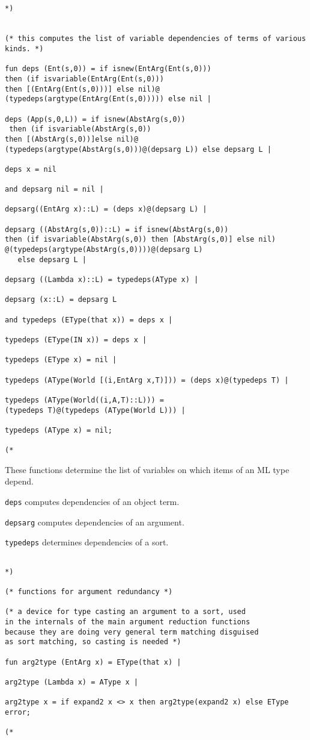 \documentclass{article}
\begin{document}
\begin{verbatim}


*)


(* this computes the list of variable dependencies of terms of various kinds. *)

fun deps (Ent(s,0)) = if isnew(EntArg(Ent(s,0))) 
then (if isvariable(EntArg(Ent(s,0)))  
then [(EntArg(Ent(s,0)))] else nil)@
(typedeps(argtype(EntArg(Ent(s,0))))) else nil |

deps (App(s,0,L)) = if isnew(AbstArg(s,0))
 then (if isvariable(AbstArg(s,0))   
then [(AbstArg(s,0))]else nil)@
(typedeps(argtype(AbstArg(s,0)))@(depsarg L)) else depsarg L |

deps x = nil 

and depsarg nil = nil |

depsarg((EntArg x)::L) = (deps x)@(depsarg L) |

depsarg ((AbstArg(s,0))::L) = if isnew(AbstArg(s,0)) 
then (if isvariable(AbstArg(s,0)) then [AbstArg(s,0)] else nil)
@(typedeps(argtype(AbstArg(s,0))))@(depsarg L)
   else depsarg L |

depsarg ((Lambda x)::L) = typedeps(AType x) |

depsarg (x::L) = depsarg L

and typedeps (EType(that x)) = deps x |

typedeps (EType(IN x)) = deps x |

typedeps (EType x) = nil |

typedeps (AType(World [(i,EntArg x,T)])) = (deps x)@(typedeps T) |

typedeps (AType(World((i,A,T)::L))) = 
(typedeps T)@(typedeps (AType(World L))) |

typedeps (AType x) = nil;

(*

\end{verbatim}

These functions determine the list of variables on which items of an ML type depend.

{\tt deps}  computes dependencies of an object term.

{\tt depsarg} computes dependencies of an argument.

{\tt typedeps} determines dependencies of a sort.

\begin{verbatim}

*)

(* functions for argument redundancy *)

(* a device for type casting an argument to a sort, used
in the internals of the main argument reduction functions
because they are doing very general term matching disguised
as sort matching, so casting is needed *)

fun arg2type (EntArg x) = EType(that x) |

arg2type (Lambda x) = AType x |

arg2type x = if expand2 x <> x then arg2type(expand2 x) else EType error;

(*

\end{verbatim}
\end{document}
